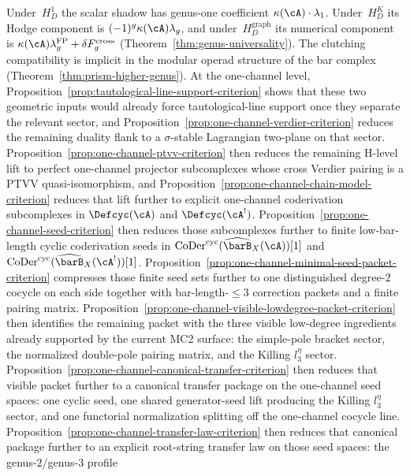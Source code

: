 \begin{remark}[Scope]\label{rem:universal-MC-scope}
Under~$H_D^1$ the scalar shadow has genus-one coefficient
$\kappa(\cA) \cdot \lambda_1$.  Under~$H_D^K$ its Hodge component is
$(-1)^g\kappa(\cA)\lambda_g$, and under~$H_D^{\mathrm{graph}}$ its
numerical component is
$\kappa(\cA)\lambda_g^{\mathrm{FP}}+\delta F_g^{\mathrm{cross}}$
(Theorem~\ref{thm:genus-universality}). The clutching compatibility
is implicit in the modular operad structure of the bar complex
(Theorem~\ref{thm:prism-higher-genus}). At the one-channel level,
Proposition~\ref{prop:tautological-line-support-criterion} shows that
these two geometric inputs would already force tautological-line
support once they separate the relevant sector, and
Proposition~\ref{prop:one-channel-verdier-criterion} reduces the
remaining duality flank to a $\sigma$-stable Lagrangian two-plane on
that sector. Proposition~\ref{prop:one-channel-ptvv-criterion} then
reduces the remaining H-level lift to perfect one-channel projector
subcomplexes whose cross Verdier pairing is a PTVV quasi-isomorphism,
and Proposition~\ref{prop:one-channel-chain-model-criterion} reduces
that lift further to explicit one-channel coderivation subcomplexes in
$\Defcyc(\cA)$ and $\Defcyc(\cA^!)$. Proposition~\ref{prop:one-channel-seed-criterion}
then reduces those subcomplexes further to finite low-bar-length
cyclic coderivation seeds in
$\operatorname{CoDer}^{\mathrm{cyc}}(\widehat{\barB}_X(\cA))[1]$ and
$\operatorname{CoDer}^{\mathrm{cyc}}(\widehat{\barB}_X(\cA^!))[1]$.
Proposition~\ref{prop:one-channel-minimal-seed-packet-criterion}
compresses those finite seed sets further to one distinguished
degree-$2$ cocycle on each side together with bar-length-$\leq 3$
correction packets and a finite pairing matrix.
Proposition~\ref{prop:one-channel-visible-lowdegree-packet-criterion}
then identifies the remaining packet with the three visible low-degree
ingredients already supported by the current MC2 surface: the
simple-pole bracket sector, the normalized double-pole pairing matrix,
and the Killing $l_3^\eta$ sector.
Proposition~\ref{prop:one-channel-canonical-transfer-criterion} then
reduces that visible packet further to a canonical transfer package on
the one-channel seed spaces: one cyclic seed, one shared
generator-seed lift producing the Killing $l_3^\eta$ sector, and one
functorial normalization splitting off the one-channel cocycle line.
Proposition~\ref{prop:one-channel-transfer-law-criterion} then reduces
that canonical package further to an explicit root-string transfer law
on those seed spaces: the genus-$2$/genus-$3$ profile

\end{remark}

